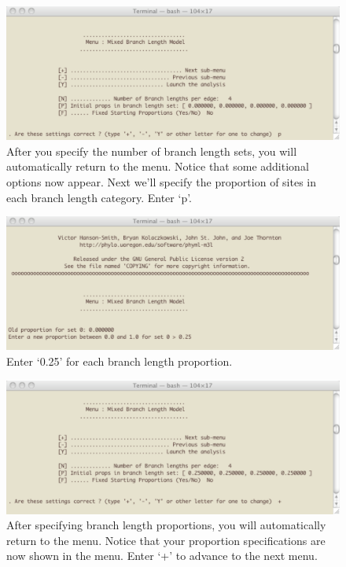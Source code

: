 \documentclass[11pt]{article}
\begin{document}
\begin{figure}[p]
\centering
\includegraphics[width=5.5 in]{GRAPHICS/a5.pdf}
\caption{After you specify the number of branch length sets, you will automatically return to the menu.  Notice that some additional options now appear.  Next we'll specify the proportion of sites in each branch length category.  Enter `p'.}
\end{figure}
\clearpage

\begin{figure}[p]
\centering
\includegraphics[width=5.5 in]{GRAPHICS/a6.pdf}
\caption{Enter `0.25' for each branch length proportion. }
\end{figure}
\clearpage

\begin{figure}[p]
\centering
\includegraphics[width=5.5 in]{GRAPHICS/a7.pdf}
\caption{After specifying branch length proportions, you will automatically return to the menu.  Notice that your proportion specifications are now shown in the menu.  Enter `+' to advance to the next menu.}
\end{figure}
\clearpage
\end{document}
